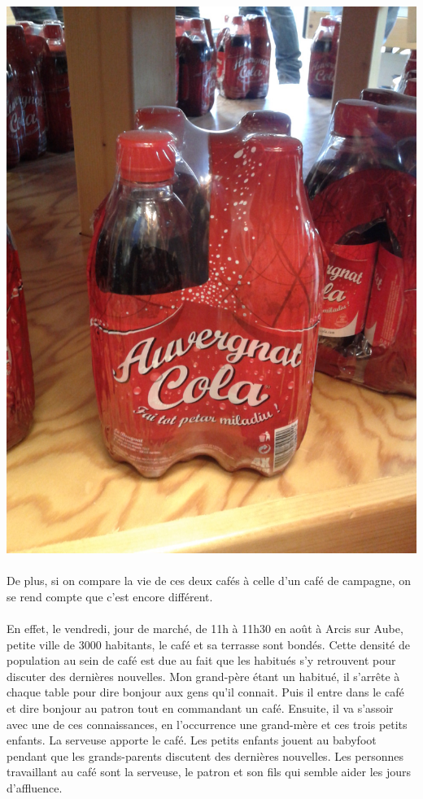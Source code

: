 \begin{center}
	\includegraphics[scale=0.15,angle=270]{AuvergnatCola.jpg}
\end{center}

\paragraph{} De plus, si on compare la vie de ces deux cafés à celle d'un café
de campagne, on se rend compte que c'est encore différent.

\paragraph{} En effet, le vendredi, jour de marché, de 11h à 11h30 en août à
Arcis sur Aube, petite ville de 3000 habitants, le café et sa terrasse sont
bondés. Cette densité de population au sein de café est due au fait que les
habitués s'y retrouvent pour discuter des dernières nouvelles. Mon grand-père
étant un habitué, il s'arrête à chaque table pour dire bonjour aux gens qu'il
connait.  Puis il entre dans le café et dire bonjour au patron tout en
commandant un café. Ensuite, il va s'assoir avec une de ces connaissances, en
l'occurrence une grand-mère et ces trois petits enfants. La serveuse apporte le
café. Les petits enfants jouent au babyfoot pendant que les grands-parents
discutent des dernières nouvelles. Les personnes travaillant au café sont la
serveuse, le patron et son fils qui semble aider les jours d'affluence.

